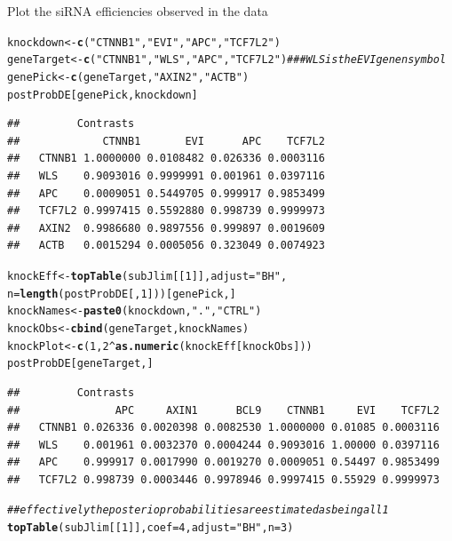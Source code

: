 \documentclass[a4paper]{article}\usepackage[]{graphicx}\usepackage[]{color}
\makeatletter
\newcommand{\hlnum}[1]{\textcolor[rgb]{0.686,0.059,0.569}{#1}}%
\newcommand{\hlstr}[1]{\textcolor[rgb]{0.192,0.494,0.8}{#1}}%
\newcommand{\hlcom}[1]{\textcolor[rgb]{0.678,0.584,0.686}{\textit{#1}}}%
\newcommand{\hlopt}[1]{\textcolor[rgb]{0,0,0}{#1}}%
\newcommand{\hlstd}[1]{\textcolor[rgb]{0.345,0.345,0.345}{#1}}%
\newcommand{\hlkwb}[1]{\textcolor[rgb]{0.69,0.353,0.396}{#1}}%
\newcommand{\hlkwc}[1]{\textcolor[rgb]{0.333,0.667,0.333}{#1}}%
\newcommand{\hlkwd}[1]{\textcolor[rgb]{0.737,0.353,0.396}{\textbf{#1}}}%
\newenvironment{kframe}{%
 \def\at@end@of@kframe{}%
 \ifinner\ifhmode%
  \def\at@end@of@kframe{\end{minipage}}%
  \begin{minipage}{\columnwidth}%
 \fi\fi%
 \def\FrameCommand##1{\hskip\@totalleftmargin \hskip-\fboxsep
 \colorbox{shadecolor}{##1}\hskip-\fboxsep
     \hskip-\linewidth \hskip-\@totalleftmargin \hskip\columnwidth}%
 \MakeFramed {\advance\hsize-\width
   \@totalleftmargin\z@ \linewidth\hsize
   \@setminipage}}%
 {\par\unskip\endMakeFramed%
 \at@end@of@kframe}
\newenvironment{knitrout}{}{} %
\makeatother
\begin{document}
Plot the siRNA efficiencies observed in the data
\begin{knitrout}
\color{fgcolor}\begin{kframe}
\begin{alltt}
\hlstd{knockdown} \hlkwb{<-} \hlkwd{c}\hlstd{(}\hlstr{"CTNNB1"}\hlstd{,} \hlstr{"EVI"}\hlstd{,} \hlstr{"APC"}\hlstd{,} \hlstr{"TCF7L2"}\hlstd{)}
\hlstd{geneTarget} \hlkwb{<-} \hlkwd{c}\hlstd{(}\hlstr{"CTNNB1"}\hlstd{,} \hlstr{"WLS"}\hlstd{,} \hlstr{"APC"}\hlstd{,} \hlstr{"TCF7L2"}\hlstd{)} \hlcom{### WLS is the EVI genen symbol}
\hlstd{genePick} \hlkwb{<-} \hlkwd{c}\hlstd{(geneTarget,}\hlstr{"AXIN2"}\hlstd{,} \hlstr{"ACTB"}\hlstd{)}
\hlstd{postProbDE[genePick, knockdown]}
\end{alltt}
\begin{verbatim}
##         Contrasts
##             CTNNB1       EVI      APC    TCF7L2
##   CTNNB1 1.0000000 0.0108482 0.026336 0.0003116
##   WLS    0.9093016 0.9999991 0.001961 0.0397116
##   APC    0.0009051 0.5449705 0.999917 0.9853499
##   TCF7L2 0.9997415 0.5592880 0.998739 0.9999973
##   AXIN2  0.9986680 0.9897556 0.999897 0.0019609
##   ACTB   0.0015294 0.0005056 0.323049 0.0074923
\end{verbatim}
\begin{alltt}
\hlstd{knockEff} \hlkwb{<-} \hlkwd{topTable}\hlstd{(subJlim[[}\hlnum{1}\hlstd{]],} \hlkwc{adjust}\hlstd{=}\hlstr{"BH"}\hlstd{,}
                     \hlkwc{n}\hlstd{=}\hlkwd{length}\hlstd{(postProbDE[,}\hlnum{1}\hlstd{]))[genePick,]}
\hlstd{knockNames} \hlkwb{<-} \hlkwd{paste0}\hlstd{(knockdown,}\hlstr{"."}\hlstd{,}\hlstr{"CTRL"}\hlstd{)}
\hlstd{knockObs} \hlkwb{<-} \hlkwd{cbind}\hlstd{(geneTarget, knockNames)}
\hlstd{knockPlot} \hlkwb{<-} \hlkwd{c}\hlstd{(}\hlnum{1}\hlstd{,}\hlnum{2}\hlopt{^}\hlkwd{as.numeric}\hlstd{(knockEff[knockObs]))}
\hlstd{postProbDE[geneTarget,]}
\end{alltt}
\begin{verbatim}
##         Contrasts
##               APC     AXIN1      BCL9    CTNNB1     EVI    TCF7L2
##   CTNNB1 0.026336 0.0020398 0.0082530 1.0000000 0.01085 0.0003116
##   WLS    0.001961 0.0032370 0.0004244 0.9093016 1.00000 0.0397116
##   APC    0.999917 0.0017990 0.0019270 0.0009051 0.54497 0.9853499
##   TCF7L2 0.998739 0.0003446 0.9978946 0.9997415 0.55929 0.9999973
\end{verbatim}
\begin{alltt}
\hlcom{## effectively the posterio probabilities are estimated as being all 1}
\hlkwd{topTable}\hlstd{(subJlim[[}\hlnum{1}\hlstd{]],} \hlkwc{coef}\hlstd{=}\hlnum{4}\hlstd{,} \hlkwc{adjust}\hlstd{=}\hlstr{"BH"}\hlstd{,} \hlkwc{n}\hlstd{=}\hlnum{3}\hlstd{)}

\end{alltt}
\end{kframe}
\end{knitrout}
\end{document}
